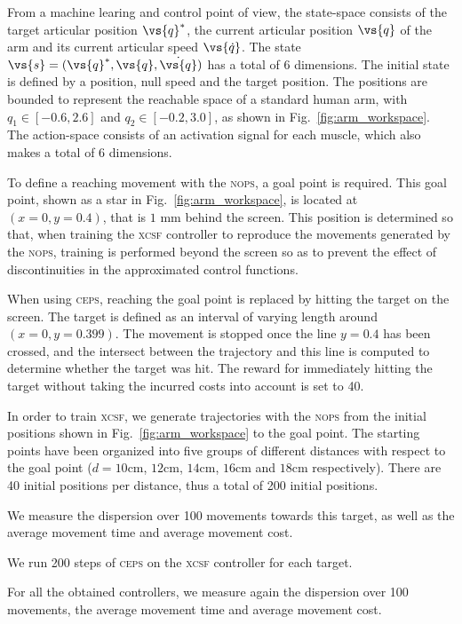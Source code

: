 \documentclass[10pt]{article}
\newcommand\ops{\textsc{nops}\xspace}
\newcommand\nops{\textsc{nops}\xspace}
\newcommand\xcsf{\textsc{xcsf}\xspace}
\newcommand\ceps{\textsc{ceps}\xspace}
\newcommand{\dq}{\vs{\dot{q}}}
\begin{document}
From a machine learing and control point of view, the state-space consists of the target articular position $\vs{q}^*$, the current articular position $\vs{q}$ of the arm and its current articular speed $\dq$. The state $ \vs{s} = (\vs{q}^*, \vs{q}, \dot{\vs{q}})$ has a total of 6 dimensions. The initial state is defined by a position, null speed and the target position. The positions are bounded to represent the reachable space of a standard human arm, with $q_1 \in [-0.6, 2.6]$ and $q_2 \in [-0.2, 3.0]$, as shown in Fig.~\ref{fig:arm_workspace}. The action-space consists of an activation signal for each muscle, which also makes a total of 6 dimensions. 

To define a reaching movement with the \nops, a goal point is required. 
This goal point, shown as a star in Fig.~\ref{fig:arm_workspace}, is located at $(x=0, y=0.4)$, that is $1$ mm behind the screen. This position is determined so that, when training the \xcsf controller to reproduce the movements generated by the \nops, training is performed beyond the screen so as to prevent the effect of discontinuities in the approximated control functions.


When using \ceps, reaching the goal point is replaced by hitting the target on the screen.
The target is defined as an interval of varying length around $(x=0, y=0.399)$. The movement
is stopped once the line $y=0.4$ has been crossed, and the intersect between the trajectory
and this line is computed to determine whether the target was hit.
The reward for immediately hitting the target without taking the incurred costs into account is set to 40.

In order to train \xcsf, we generate trajectories with the \ops from the initial positions shown in Fig.~\ref{fig:arm_workspace} to the goal point. The starting points have been organized into five groups of different distances with respect to the goal point ($d=10$cm, $12$cm, $14$cm, $16$cm and $18$cm respectively). There are 40 initial positions per distance, thus a total of 200 initial positions.

We measure the dispersion over 100 movements towards this target, as well as the average movement time and average movement cost.

We run 200 steps of \ceps on the \xcsf controller for each target.

For all the obtained controllers, we measure again the dispersion over 100 movements, the average movement time and average movement cost.
\end{document}
